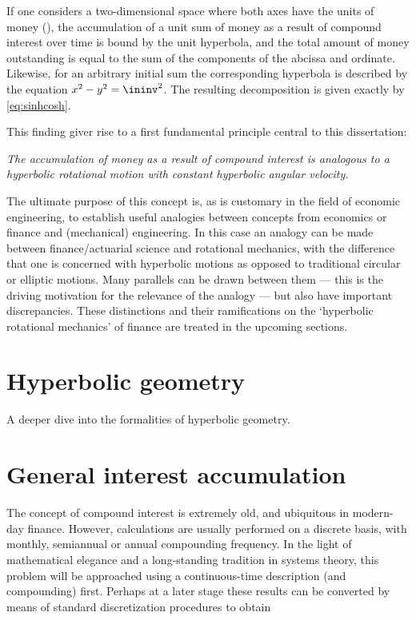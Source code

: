 If one considers a two-dimensional space where both axes have the units of money (\si{\money}), the accumulation of a unit sum of money as a result of compound interest over time is bound by the unit hyperbola, and the total amount of money outstanding is equal to the sum of the components of the abcissa and ordinate. Likewise, for an arbitrary initial sum \ininv the corresponding hyperbola is described by the equation \(x^2 - y^2 = \ininv^2\). The resulting decomposition is given exactly by \cref{eq:sinhcosh}.

This finding giver rise to a first fundamental principle central to this dissertation:

\textit{
The accumulation of money as a result of compound interest is analogous to a hyperbolic rotational motion with constant hyperbolic angular velocity.}

The ultimate purpose of this concept is, as is customary in the field of economic engineering, to establish useful analogies between concepts from economics or finance and (mechanical) engineering. In this case an analogy can be made between finance/actuarial science and rotational mechanics, with the difference that one is concerned with hyperbolic motions as opposed to traditional circular or elliptic motions. Many parallels can be drawn between them --- this is the driving motivation for the relevance of the analogy --- but also have important discrepancies. These distinctions and their ramifications on the `hyperbolic rotational mechanics' of finance are treated in the upcoming sections.

\section{Hyperbolic geometry}
A deeper dive into the formalities of hyperbolic geometry.

\section{General interest accumulation}
The concept of compound interest is extremely old, and ubiquitous in modern-day finance. However, calculations are usually performed on a discrete basis, with monthly, semiannual or annual compounding frequency. In the light of mathematical elegance and a long-standing tradition in systems theory, this problem will be approached using a continuous-time description (and compounding) first. Perhaps at a later stage these results can be converted by means of standard discretization procedures to obtain 

